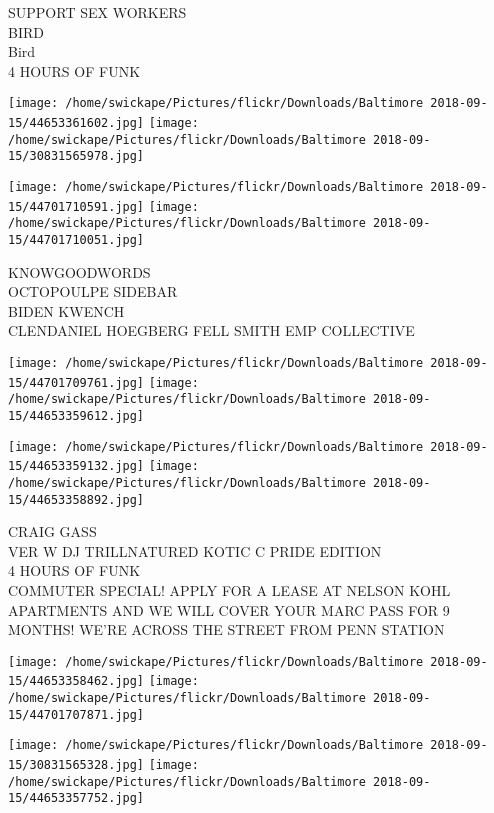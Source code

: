 \documentclass[10pt,letterpaper]{article}
\begin{document}
SUPPORT SEX WORKERS\\
BIRD\\
Bird\\
4 HOURS OF FUNK\\
\pagebreak

\texttt{[image: /home/swickape/Pictures/flickr/Downloads/Baltimore 2018-09-15/44653361602.jpg]}
\texttt{[image: /home/swickape/Pictures/flickr/Downloads/Baltimore 2018-09-15/30831565978.jpg]}

\texttt{[image: /home/swickape/Pictures/flickr/Downloads/Baltimore 2018-09-15/44701710591.jpg]}
\texttt{[image: /home/swickape/Pictures/flickr/Downloads/Baltimore 2018-09-15/44701710051.jpg]}

KNOWGOODWORDS\\
OCTOPOULPE SIDEBAR\\
BIDEN KWENCH\\
CLENDANIEL HOEGBERG FELL SMITH EMP COLLECTIVE\\
\pagebreak

\texttt{[image: /home/swickape/Pictures/flickr/Downloads/Baltimore 2018-09-15/44701709761.jpg]}
\texttt{[image: /home/swickape/Pictures/flickr/Downloads/Baltimore 2018-09-15/44653359612.jpg]}

\texttt{[image: /home/swickape/Pictures/flickr/Downloads/Baltimore 2018-09-15/44653359132.jpg]}
\texttt{[image: /home/swickape/Pictures/flickr/Downloads/Baltimore 2018-09-15/44653358892.jpg]}

CRAIG GASS\\
VER W DJ TRILLNATURED KOTIC C PRIDE EDITION\\
4 HOURS OF FUNK\\
COMMUTER SPECIAL!  APPLY FOR A LEASE AT NELSON KOHL APARTMENTS AND WE WILL COVER YOUR MARC PASS FOR 9 MONTHS!  WE'RE ACROSS THE STREET FROM PENN STATION\\
\pagebreak

\texttt{[image: /home/swickape/Pictures/flickr/Downloads/Baltimore 2018-09-15/44653358462.jpg]}
\texttt{[image: /home/swickape/Pictures/flickr/Downloads/Baltimore 2018-09-15/44701707871.jpg]}

\texttt{[image: /home/swickape/Pictures/flickr/Downloads/Baltimore 2018-09-15/30831565328.jpg]}
\texttt{[image: /home/swickape/Pictures/flickr/Downloads/Baltimore 2018-09-15/44653357752.jpg]}
\end{document}
